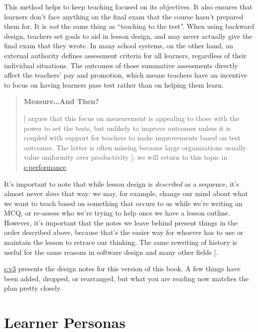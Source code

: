This method helps to keep teaching focused on its objectives. It also
ensures that learners don't face anything on the final exam that the
course hasn't prepared them for. It is \emph{not} the same thing as
``teaching to the test''. When using backward design, teachers set goals
to aid in lesson design, and may never actually give the final exam
that they wrote. In many school systems, on the other hand, an
external authority defines assessment criteria for all learners,
regardless of their individual situations. The outcomes of those
summative assessments directly affect the teachers' pay and promotion,
which means teachers have an incentive to focus on having learners
pass test rather than on helping them learn.

\begin{quote}\setlength{\parindent}{0pt}
\textbf{Measure\ldots{}And Then?}

{[}\protect[\hyperlink{b:Gree2014}{Gree2014}]{]} argues that this focus on measurement is
appealing to those with the power to set the tests, but unlikely to
improve outcomes unless it is coupled with support for teachers to
make improvements based on test outcomes. The latter is often
missing because large organizations usually value uniformity over
productivity {[}\protect[\hyperlink{b:Scot1998}{Scot1998}]{]}; we will return to this topic in
\protect\hyperlink{CHAPTER}{s:performance}.
\end{quote}

It's important to note that while lesson design is \emph{described} as a
sequence, it's almost never \emph{done} that way: we may, for example,
change our mind about what we want to teach based on something that
occurs to us while we're writing an MCQ, or re-assess who we're trying
to help once we have a lesson outline. However, it's important that
the notes we leave behind present things in the order described above,
because that's the easier way for whoever has to use or maintain the
lesson to retrace our thinking. The same rewriting of history is
useful for the same reasons in software design and many other fields
{[}\protect[\hyperlink{b:Parn1986}{Parn1986}]{]}.

\protect\hyperlink{APPENDIX}{s:v3} presents the design notes for this version of this
book. A few things have been added, dropped, or rearranged, but what
you are reading now matches the plan pretty closely.

\section{Learner Personas}\label{s:process-personas}

